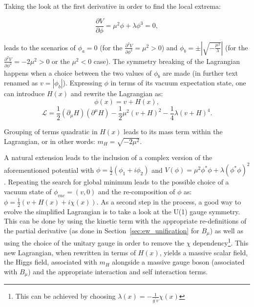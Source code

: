 Taking the look at the first derivative in order to find the local extrema:

\begin{equation}
    \frac{\partial V}{\partial \phi} = \mu^2\phi + \lambda \phi^3 = 0,
\end{equation}

leads to the scenarios of $\phi_a = 0$ (for the $\frac{\partial^2 V}{\partial \phi^2} = \mu^2>0$) and $\phi_b = \pm|\sqrt{-\frac{\mu^2}{\lambda}}|$ (for the $\frac{\partial^2 V}{\partial \phi^2} = -2\mu^2>0$ or the $\mu^2<0$ case). The symmetry breaking of the Lagrangian happens when a choice between the two values of $\phi_b$ are made (in further text renamed as $v = |\phi_b|$). Expressing $\phi$ in terms of its vacuum expectation state, one can introduce $H(x)$ and rewrite the Lagrangian as:
\begin{equation}
    \phi(x) = v+H(x),
\end{equation}
\begin{equation}
    \mathcal{L} = \frac{1}{2}(\partial_{\mu}H)(\partial^{\mu}H) - \frac{1}{2}\mu^2(v+H)^2 - \frac{1}{4}\lambda(v+H)^4.
\end{equation}

Grouping of terms quadratic in $H(x)$ leads to its mass term within the Lagrangian, or in other words: $m_{H} = \sqrt{-2\mu^2}$.

\hspace{10pt} A natural extension leads to the inclusion of a complex version of the aforementioned potential with $\phi = \frac{1}{2} (\phi_1+i\phi_2)$ and $V(\phi) = \mu^2\phi^*\phi+\lambda(\phi^*\phi)^2$. Repeating the search for global minimum leads to the possible choice of a vacuum state of $\phi_{vac} = (v, 0)$ and the re-composition of $\phi$ as: $\phi = \frac{1}{2}(v+H(x)+i\chi(x))$. As a second step in the process, a good way to evolve the simplified Lagrangian is to take a look at the U(1) gauge symmetry. This can be done by using the kinetic term with the appropriate re-definitions of the partial derivative (as done in Section~\ref{sec:ew_unification} for $B_{\mu}$) as well as using the choice of the unitary gauge in order to remove the $\chi$ dependency\footnote{This can be achieved by choosing $\lambda(x) = -\frac{1}{g^{'}v}\chi(x)$}. This new Lagrangian, when rewritten in terms of $H(x)$, yields a massive scalar field, the Higgs field, associated with $m_{H}$ alongside a massive gauge boson (associated with $B_{\mu}$) and the appropriate interaction and self interaction terms.


